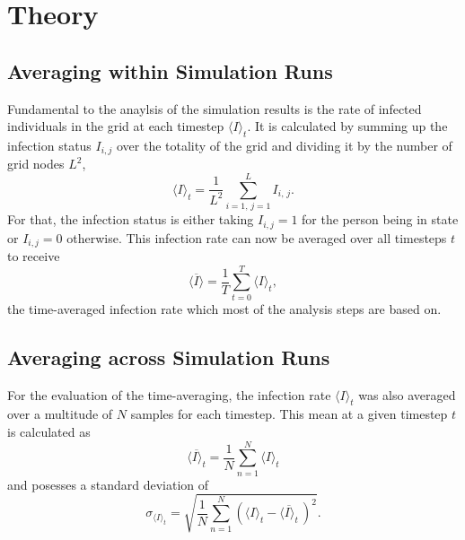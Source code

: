 \section{Theory}

\subsection{Averaging within Simulation Runs}

Fundamental to the anaylsis of the simulation results is the rate of infected individuals in the grid at each timestep $\langle I\rangle_t$. It is calculated by summing up the infection status $I_{i,j}$
over the totality of the grid and dividing it by the number of grid nodes $L^2$,
\begin{equation}
    \langle I\rangle_t=\frac{1}{L^2}\sum_{i=1,\,j=1}^{L}I_{i,\,j}.
    \label{eq:theo_inf_rate}
\end{equation}
For that, the infection status is either taking $I_{i,j}=1$ for the person being in state \infected{} or $I_{i,j}=0$ otherwise. This infection rate can now be averaged over all timesteps $t$ to receive
\begin{equation}
    \overline{\langle I\rangle}=\frac{1}{T}\sum_{t=0}^{T}\langle I\rangle_t,
    \label{eq:theo_time_avg_inf_rate}
\end{equation}
the time-averaged infection rate which most of the analysis steps are based on.

\subsection{Averaging across Simulation Runs}

For the evaluation of the time-averaging, the infection rate $\langle I\rangle_t$ was also averaged over a multitude of $N$ samples for each timestep. This mean at a given timestep $t$ is calculated as
\begin{equation}
    \overline{\langle I\rangle_t}=\frac{1}{N}\sum_{n=1}^{N}\langle I\rangle_t
    \label{eq:theo_mean_inf_rate}
\end{equation}
and posesses a standard deviation of
\begin{equation}
    \sigma_{\langle I\rangle_t}=\sqrt{\frac{1}{N}\sum_{n=1}^{N}\left(\langle I\rangle_t-\overline{\langle I\rangle_t}\,\right)^2}.
    \label{eq:theo_sigma_inf_rate}
\end{equation}